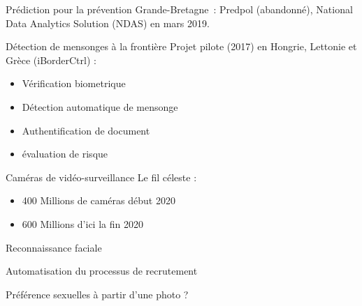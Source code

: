 \begin{frame}{Prédiction pour la prévention}
  Grande-Bretagne~: Predpol (abandonné), National Data Analytics Solution (NDAS) en mars 2019.

\end{frame}

\begin{frame}{Détection de mensonges à la frontière}
  Projet pilote (2017) en Hongrie, Lettonie et Grèce (iBorderCtrl) :
  \begin{itemize}
    \item Vérification biometrique
    \item Détection automatique de mensonge
    \item Authentification de document 
    \item évaluation de risque
  \end{itemize}
\end{frame}

\begin{frame}{Caméras de vidéo-surveillance}
  Le fil céleste :

  \begin{itemize}
  \item 400 Millions de caméras début 2020 
  \item 600 Millions d'ici la fin 2020
  \end{itemize}

  \begin{minipage}[c]{0.49\linewidth}
  \end{minipage}\hfill
  \begin{minipage}[c]{0.49\linewidth}
  \end{minipage}\hfill
\end{frame}

\begin{frame}{Reconnaissance faciale}
\end{frame}

\begin{frame}{Automatisation du processus de recrutement}
\end{frame}

\begin{frame}{Préférence sexuelles à partir d'une photo ?}
\end{frame}

